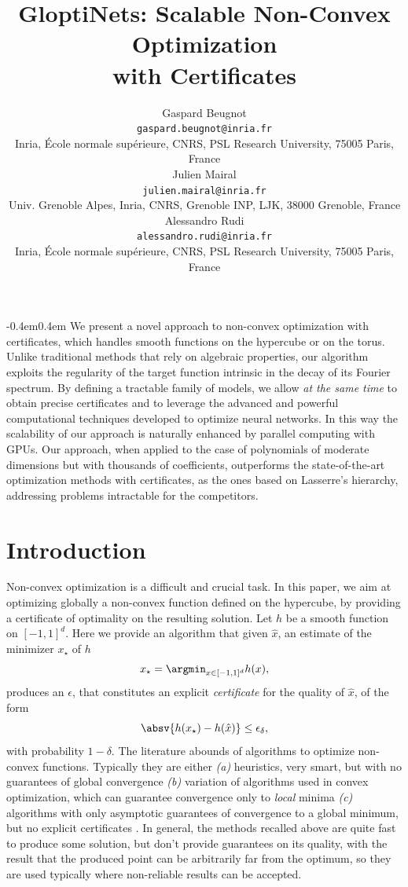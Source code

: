 \documentclass{article}
\title{GloptiNets: Scalable Non-Convex Optimization \\ with Certificates}
\author{%
 Gaspard Beugnot \\
 \texttt{gaspard.beugnot@inria.fr} \\
 Inria, \'Ecole normale sup\'erieure, CNRS, PSL Research University, 75005 Paris, France\\
 \AND
 Julien Mairal \\
 \texttt{julien.mairal@inria.fr} \\
 Univ. Grenoble Alpes, Inria, CNRS, Grenoble INP, LJK, 38000 Grenoble, France \\
 \And
 Alessandro Rudi \\
 \texttt{alessandro.rudi@inria.fr} \\
 Inria, \'Ecole normale sup\'erieure, CNRS, PSL Research University, 75005 Paris, France\\
}
\let\oldabstract\abstract
\let\endoldabstract\endabstract
\renewenvironment{abstract}
  {\begin{adjustwidth}{-0.4em}{0.4em}\oldabstract}
  {\endoldabstract\end{adjustwidth}}
\begin{document}
\maketitle

\begin{abstract}
  We present a novel approach to non-convex optimization with certificates, which handles smooth functions on the hypercube or on the torus. Unlike traditional methods that rely on algebraic properties, our algorithm exploits the regularity of the target function intrinsic in the decay of its Fourier spectrum. By defining a tractable family of models, we allow \emph{at the same time} to obtain precise certificates and to leverage the advanced and powerful computational techniques developed to optimize neural networks. In this way the scalability of our approach is naturally enhanced by parallel computing with GPUs. Our approach, when applied to the case of polynomials of moderate dimensions but with thousands of coefficients, outperforms the state-of-the-art optimization methods with certificates, as the ones based on Lasserre's hierarchy, addressing problems intractable for the competitors.
\end{abstract}

\section{Introduction}

Non-convex optimization is a difficult and crucial task. In this paper, we aim at optimizing globally a non-convex function defined on the hypercube, by providing a certificate of optimality on the resulting solution. Let $h$ be a smooth function on $[-1,1]^d$. Here we provide an algorithm that given $\hat{x}$, an estimate of the minimizer $x_\star$ of $h$
\begin{equation*}
  x_\star = \argmin_{x \in [-1,1]^d} h(x),
\end{equation*}
produces an $\epsilon$, that constitutes an explicit \emph{certificate} for the quality of $\widehat{x}$, of the form
\begin{equation*}
  \absv{h(x_\star) - h(\hat{x})} \leq \epsilon_\delta,
\end{equation*}
with probability $1-\delta$.
The literature abounds of algorithms to optimize non-convex functions. Typically they are either \emph{(a)} heuristics, very smart, but with no guarantees of global convergence \cite{moscato1989evolution,horst2013handbook} \emph{(b)} variation of algorithms used in convex optimization, which can guarantee convergence only to \emph{local} minima \cite{boyd2004convex} \emph{(c)} algorithms with only asymptotic guarantees of convergence to a global minimum, but no explicit certificates \cite{van1987simulated}. In general, the methods recalled above are quite fast to produce some solution, but don't provide guarantees on its quality, with the result that the produced point can be arbitrarily far from the optimum, so they are used typically where non-reliable results can be accepted.
\end{document}
